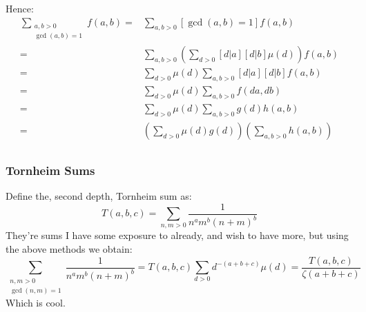 Hence:
\begin{equation*}
\begin{aligned}
\sum_{\substack{a,b > 0\\ \gcd(a,b) = 1}}f(a,b) =& \sum_{a,b>0}[\gcd(a,b)=1]f(a,b)\\
=&\sum_{a,b>0}\left(\sum_{d>0}[d|a][d|b]\mu(d)\right)f(a,b) \\
=&\sum_{d>0}\mu(d)\sum_{a,b>0}[d|a][d|b]f(a,b) \\
=&\sum_{d>0}\mu(d)\sum_{a,b>0}f(da,db) \\
=&\sum_{d>0}\mu(d)\sum_{a,b>0}g(d)h(a,b) \\
=& \left(\sum_{d>0}\mu(d)g(d)\right)\left(\sum_{a,b>0}h(a,b)\right)\\
\end{aligned}
\end{equation*}

\subsubsection{Tornheim Sums}
Define the, second depth, Tornheim sum as:
\[T(a,b,c) = \sum_{n,m>0}\frac{1}{n^am^b(n+m)^b}\]
They're sums I have some exposure to already,
and wish to have more,
but using the above methods we obtain:
\[\sum_{\substack{n,m>0\\\gcd(n,m)=1}}\frac{1}{n^am^b(n+m)^b} = T(a,b,c)\sum_{d>0}d^{-(a+b+c)}\mu(d) = \frac{T(a,b,c)}{\zeta(a+b+c)}\]
Which is cool.
